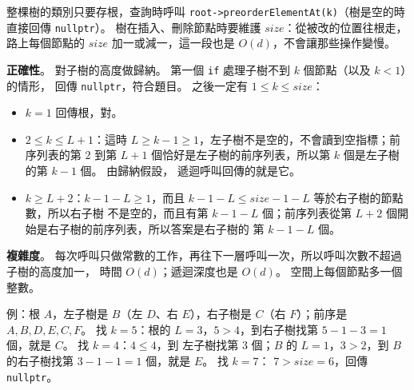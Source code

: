\begin{pastsoln}
整棵樹的類別只要存根，查詢時呼叫 \texttt{root->preorderElementAt(k)}（樹是空的時直接回傳
\texttt{nullptr}）。 樹在插入、刪除節點時要維護 $\mathit{size}$：從被改的位置往根走，路上每個節點的
$\mathit{size}$ 加一或減一，這一段也是 $O(d)$，不會讓那些操作變慢。

\textbf{正確性}。 對子樹的高度做歸納。 第一個 \texttt{if} 處理子樹不到 $k$ 個節點（以及 $k < 1$）的情形，
回傳 \texttt{nullptr}，符合題目。 之後一定有 $1 \le k \le \mathit{size}$：
\begin{itemize}
\item $k = 1$ 回傳根，對。
\item $2 \le k \le L + 1$：這時 $L \ge k - 1 \ge 1$，左子樹不是空的，不會讀到空指標；前序列表的第
$2$ 到第 $L + 1$ 個恰好是左子樹的前序列表，所以第 $k$ 個是左子樹的第 $k - 1$ 個。 由歸納假設，
遞迴呼叫回傳的就是它。
\item $k \ge L + 2$：$k - 1 - L \ge 1$，而且 $k - 1 - L \le \mathit{size} - 1 - L$ 等於右子樹的節點數，所以右子樹
不是空的，而且有第 $k - 1 - L$ 個；前序列表從第 $L + 2$ 個開始是右子樹的前序列表，所以答案是右子樹的
第 $k - 1 - L$ 個。
\end{itemize}

\textbf{複雜度}。 每次呼叫只做常數的工作，再往下一層呼叫一次，所以呼叫次數不超過子樹的高度加一，
時間 $O(d)$；遞迴深度也是 $O(d)$。 空間上每個節點多一個整數。

例：根 $A$，左子樹是 $B$（左 $D$、右 $E$），右子樹是 $C$（右 $F$）；前序是 $A, B, D, E, C, F$。
找 $k = 5$：根的 $L = 3$，$5 > 4$，到右子樹找第 $5 - 1 - 3 = 1$ 個，就是 $C$。 找 $k = 4$：$4 \le 4$，到
左子樹找第 $3$ 個；$B$ 的 $L = 1$，$3 > 2$，到 $B$ 的右子樹找第 $3 - 1 - 1 = 1$ 個，就是 $E$。 找 $k = 7$：
$7 > \mathit{size} = 6$，回傳 \texttt{nullptr}。
\end{pastsoln}
